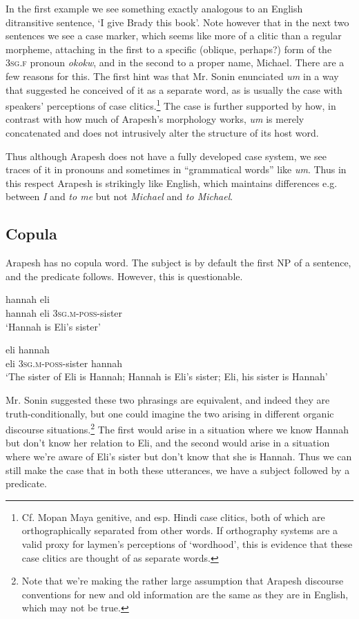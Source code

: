 \documentclass[pdftex,12pt,letterpaper]{article}
\let\ipa\textipa
\begin{document}
 \noindent In the first example we see something exactly analogous to an English ditransitive sentence, `I give Brady this book'. Note however that in the next two sentences we see a case marker, which seems like more of a clitic than a regular morpheme, attaching in the first to a specific (oblique, perhaps?) form of the \textsc{3sg.f} pronoun \emph{okokw}, and in the second to a proper name, Michael. There are a few reasons for this. The first hint was that Mr. Sonin enunciated \emph{um} in a way that suggested he conceived of it as a separate word, as is usually the case with speakers' perceptions of case clitics.\footnote{Cf. Mopan Maya genitive, and esp. Hindi case clitics, both of which are orthographically separated from other words. If orthography systems are a valid proxy for laymen's perceptions of `wordhood', this is evidence that these case clitics are thought of as separate words.} The case is further supported by how, in contrast with how much of Arapesh's morphology works, \emph{um} is merely concatenated and does not intrusively alter the structure of its host word.

 Thus although Arapesh does not have a fully developed case system, we see traces of it in pronouns and sometimes in ``grammatical words'' like \emph{um}. Thus in this respect Arapesh is strikingly like English, which maintains differences e.g. between \emph{I} and \emph{to me} but not \emph{Michael} and \emph{to Michael}.

 \subsection{Copula}

 Arapesh has no copula word. The subject is by default the first NP of a sentence, and the predicate follows. However, this is questionable.

 \begin{exe}
 \ex 
 \gll hannah eli \ipa{@n@n-ik-mohokwik} \\
 hannah eli \textsc{3sg.m-poss}-sister \\
 \trans `Hannah is Eli's sister'

 \ex 
 \gll eli \ipa{@n@n-ik-mohokwik} hannah  \\
 eli \textsc{3sg.m-poss}-sister hannah\\
 \trans `The sister of Eli is Hannah; Hannah is Eli's sister; Eli, his sister is Hannah'
 \end{exe}

 \noindent Mr. Sonin suggested these two phrasings are equivalent, and indeed they are truth-conditionally, but one could imagine the two arising in different organic discourse situations.\footnote{Note that we're making the rather large assumption that Arapesh discourse conventions for new and old information are the same as they are in English, which may not be true.} The first would arise in a situation where we know Hannah but don't know her relation to Eli, and the second would arise in a situation where we're aware of Eli's sister but don't know that she is Hannah. Thus we can still make the case that in both these utterances, we have a subject followed by a predicate. 
\end{document}
